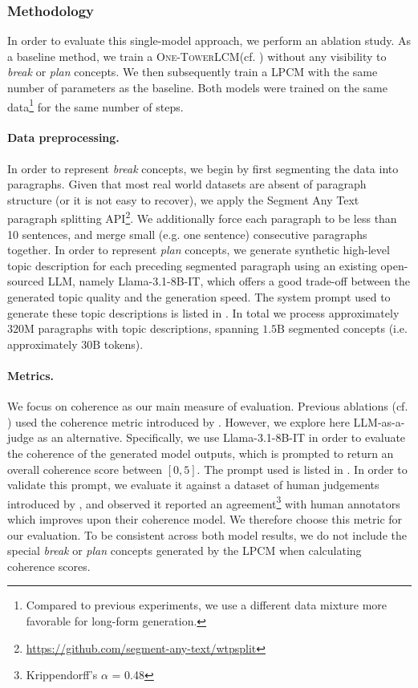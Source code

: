 \documentclass[twoside,11pt]{fairmeta}
\newcommand{\llm}{\textsc{LLM}\xspace}
\newcommand{\lcm}{\textsc{LCM}\xspace}
\newcommand{\interleaved}{\textsc{One-Tower}\xspace}
\newcommand{\planlcm}{\textsc{LPCM}\xspace}
\begin{document}
\subsubsection*{Methodology} %

In order to evaluate this single-model approach, we perform an ablation study. As a baseline method, we train a \interleaved \lcm (cf. ) without any visibility to \emph{break} or \emph{plan} concepts. We then subsequently train a \planlcm with the same number of parameters as the baseline. Both models were trained on the same data\footnote{Compared to previous experiments, we use a different data mixture more favorable for long-form generation.} for the same number of steps. %

\paragraph{Data preprocessing.} 
In order to represent \emph{break} concepts, we begin by first segmenting the data into paragraphs. 
Given that most real world datasets are absent of paragraph structure (or it is not easy to recover), 
we apply the Segment Any Text \citep{frohmann-etal-2024-segment} paragraph splitting API\footnote{\url{https://github.com/segment-any-text/wtpsplit}}. 
We additionally force each paragraph to be less than 10 sentences, and merge small (e.g. one sentence) consecutive paragraphs together.
In order to represent \emph{plan} concepts, we generate synthetic high-level topic description for each preceding segmented paragraph using an existing open-sourced \llm, namely Llama-3.1-8B-IT,
which offers a good trade-off between the generated topic quality and the generation speed. 
The system prompt used to generate these topic descriptions is listed in . 
In total we process approximately $\textrm{320M}$
paragraphs with topic descriptions, spanning $\textrm{1.5B}$ segmented concepts (i.e. approximately $\textrm{30B}$ tokens).

\paragraph{Metrics.} We focus on coherence as our main measure of evaluation. Previous ablations (cf. ) used the coherence metric introduced by \citet{jwalapuram-etal-2022-rethinking}. However, we explore here \llm-as-a-judge as an alternative. Specifically, we use Llama-3.1-8B-IT in order to evaluate the coherence of the generated model outputs, which is prompted to return an overall coherence score between $\left[0, 5\right]$. 
The prompt used is listed in .
In order to validate this prompt, we evaluate it against a dataset of human judgements introduced by \citet{jwalapuram-etal-2022-rethinking}, and observed it reported an agreement\footnote{Krippendorff's $\alpha$ = 0.48} with human annotators which improves upon their coherence model. We therefore choose this metric for our evaluation.
To be consistent across both model results, we do not include the special \emph{break} or \emph{plan} concepts generated by the \planlcm when calculating coherence scores.
\end{document}
